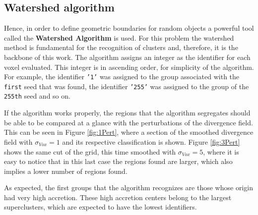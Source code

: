 \documentclass[usenatbib]{mnras}
\begin{document}
\subsection{Watershed algorithm}
 Hence, in order to define geometric boundaries for random objects a powerful tool called  the \textbf{Watershed Algorithm} is used. For this problem the watershed method is fundamental for the recognition of clusters and, therefore, it is the backbone of this work. The algorithm assigns an integer as the identifier for each voxel evaluated. This integer is in ascending order, for simplicity of the algorithm. For example, the identifier \texttt{'1'} was assigned to the group associated with the \texttt{first} seed that was found, the identifier \texttt{'255'} was assigned to the group of the \texttt{255th} seed and so on. 
 
 If the algorithm works properly, the regions that the algorithm segregates should be able to be compared at a glance with the perturbations of the divergence field. This can be seen in Figure \ref{fig:1Pert}, where a section of the smoothed divergence field with $\sigma_{Vox} = 1$ and its respective classification is shown. Figure \ref{fig:3Pert} shows the same cut of the grid, this time smoothed with $\sigma_{Vox} = 5$, where it is easy to notice that in this last case the regions found are larger, which also implies a lower number of regions found.
 
 As expected, the first groups that the algorithm recognizes are those whose origin had very high accretion. These high accretion centers belong to the largest superclusters, which are expected to have the lowest identifiers.
\end{document}
